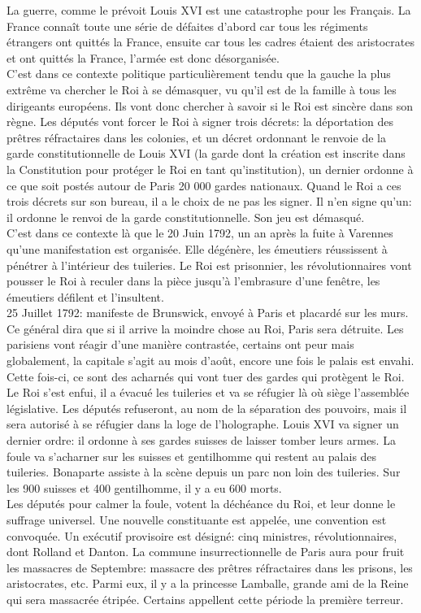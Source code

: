 \documentclass[10pt, a4paper, openany]{book}
\begin{document}
La guerre, comme le prévoit Louis XVI est une catastrophe pour les Français. La France connaît toute une série de défaites d'abord car tous les régiments étrangers ont quittés la France, ensuite car tous les cadres étaient des aristocrates et ont quittés la France, l'armée est donc désorganisée. \\
C'est dans ce contexte politique particulièrement tendu que la gauche la plus extrême va chercher le Roi à se démasquer, vu qu'il est de la famille à tous les dirigeants européens. Ils vont donc chercher à savoir si le Roi est sincère dans son règne. Les députés vont forcer le Roi à signer trois décrets: la déportation des prêtres réfractaires dans les colonies, et un décret ordonnant le renvoie de la garde constitutionnelle de Louis XVI (la garde dont la création est inscrite dans la Constitution pour protéger le Roi en tant qu'institution), un dernier ordonne à ce que soit postés autour de Paris 20 000 gardes nationaux. Quand le Roi a ces trois décrets sur son bureau, il a le choix de ne pas les signer. Il n'en signe qu'un: il ordonne le renvoi de la garde constitutionnelle. Son jeu est démasqué. \\
C'est dans ce contexte là que le 20 Juin 1792, un an après la fuite à Varennes qu'une manifestation est organisée. Elle dégénère, les émeutiers réussissent à pénétrer à l'intérieur des tuileries. Le Roi est prisonnier, les révolutionnaires vont pousser le Roi à reculer dans la pièce jusqu'à l'embrasure d'une fenêtre, les émeutiers défilent et l'insultent. \\
25 Juillet 1792: manifeste de Brunswick, envoyé à Paris et placardé sur les murs. Ce général dira que si il arrive la moindre chose au Roi, Paris sera détruite. Les parisiens vont réagir d'une manière contrastée, certains ont peur mais globalement, la capitale s'agit au mois d'août, encore une fois le palais est envahi. Cette fois-ci, ce sont des acharnés qui vont tuer des gardes qui protègent le Roi. Le Roi s'est enfui, il a évacué les tuileries et va se réfugier là où siège l'assemblée législative. Les députés refuseront, au nom de la séparation des pouvoirs, mais il sera autorisé à se réfugier dans la loge de l'holographe. Louis XVI va signer un dernier ordre: il ordonne à ses gardes suisses de laisser tomber leurs armes. La foule va s'acharner sur les suisses et gentilhomme qui restent au palais des tuileries. Bonaparte assiste à la scène depuis un parc non loin des tuileries. Sur les 900 suisses et 400 gentilhomme, il y a eu 600 morts. \\
Les députés pour calmer la foule, votent la déchéance du Roi, et leur donne le suffrage universel. Une nouvelle constituante est appelée, une convention est convoquée. Un exécutif provisoire est désigné: cinq ministres, révolutionnaires, dont Rolland et Danton. La commune insurrectionnelle de Paris aura pour fruit les massacres de Septembre: massacre des prêtres réfractaires dans les prisons, les aristocrates, etc. Parmi eux, il y a la princesse Lamballe, grande ami de la Reine qui sera massacrée étripée. Certains appellent cette période la première terreur. 
\end{document}
